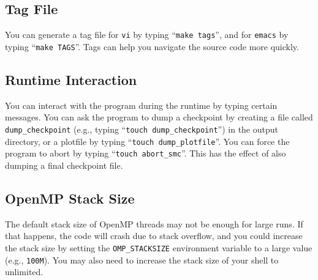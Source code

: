\documentclass[11pt,letterpaper]{article}
\begin{document}
\subsection{Tag File}

You can generate a tag file for {\tt vi} by typing ``{\tt make
  tags}'', and for {\tt emacs} by typing ``{\tt make TAGS}''.  Tags
can help you navigate the source code more quickly.

\subsection{Runtime Interaction}

You can interact with the program during the runtime by typing certain
messages.  You can ask the program to dump a checkpoint by creating a
file called {\tt dump\_checkpoint} (e.g., typing ``{\tt touch
  dump\_checkpoint}'') in the output directory, or a plotfile by
typing ``{\tt touch dump\_plotfile}''.  You can force the program to
abort by typing ``{\tt touch abort\_smc}''.  This has the effect of
also dumping a final checkpoint file.

\subsection{OpenMP Stack Size}

The default stack size of OpenMP threads may not be enough for large
runs.  If that happens, the code will crash due to stack overflow, and
you could increase the stack size by setting the {\tt OMP\_STACKSIZE}
environment variable to a large value (e.g., {\tt 100M}).  You may
also need to increase the stack size of your shell to unlimited.




\end{document}
